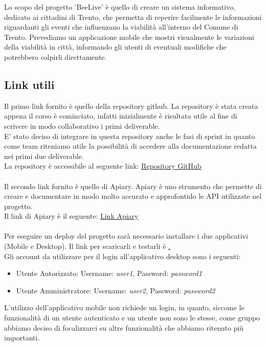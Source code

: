 \documentclass{article}
\begin{document}
Lo scopo del progetto 'BeeLive' è quello di creare un sistema informativo, dedicato ai cittadini di Trento, che permetta di reperire facilmente le informazioni riguardanti gli eventi che influenzano la viabilità all'interno del Comune di Trento. Prevediamo un applicazione mobile che mostri visualmente le variazioni della viabilità in città, informando gli utenti di eventuali modifiche che potrebbero colpirli direttamente. 

\subsection{Link utili}
Il primo link fornito è quello della repository github. La repository è stata creata appena il corso è cominciato, infatti inizialmente è risultata utile al fine di scrivere in modo collaborativo i primi deliverable.\\
E' stato deciso di integrare in questa repository anche le fasi di sprint in quanto come team riteniamo utile la possibilità di accedere alla documentazione redatta nei primi due deliverable.\\
La repository è accessibile al seguente link: \href{https://github.com/ELI20ZIVI/BeeLive/}{Repository GitHub}\\ \\
Il secondo link fornito è quello di Apiary. Apiary è uno strumento che permette di creare e documentare in modo molto accurato e approfontido le API utilizzate nel progetto.\\
Il link di Apiary è il seguente: \href{https://beelive.docs.apiary.io/#}{Link Apiary}\\ \\
Per eseguire un deploy del progetto sarà necessario installare i due applicativi (Mobile e Desktop). Il link per scaricarli e testarli è \href{github-release-page}.\\
Gli account da utilizzare per il login all'applicativo desktop sono i seguenti:
\begin{itemize}
    \item Utente Autorizzato: Username: \textit{user1}, Password: \textit{password1}
    \item Utente Amministratore: Username: \textit{user2}, Password: \textit{password2}
\end{itemize}
L'utilizzo dell'applicativo mobile non richiede un login, in quanto, siccome le funzionalità di un utente autenticato e un utente non sono le stesse, come gruppo abbiamo deciso di focalizzarci su altre funzionalità che abbiamo ritenuto più importanti.
\end{document}
